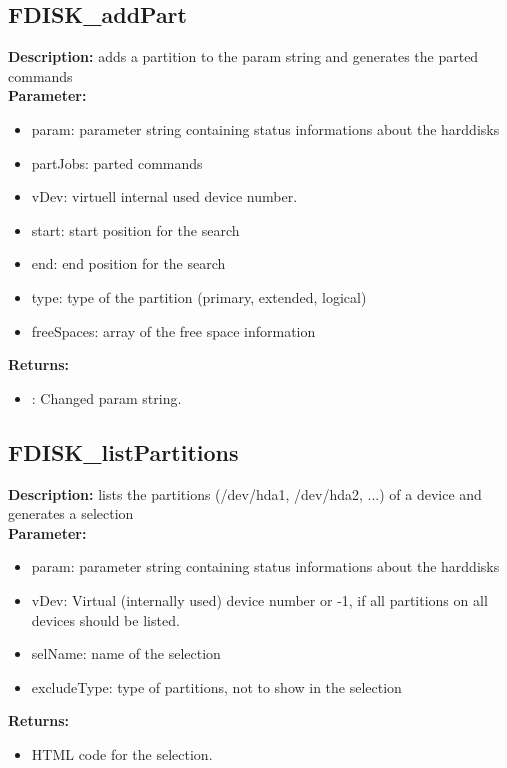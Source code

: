 \subsection{FDISK\_addPart}
\textbf{Description:} adds a partition to the param string and generates the parted commands\\
\textbf{Parameter:}
\begin{itemize}
\item param: parameter string containing status informations about the harddisks
\item partJobs: parted commands
\item vDev: virtuell internal used device number.
\item start: start position for the search
\item end: end position for the search
\item type: type of the partition (primary, extended, logical)
\item freeSpaces: array of the free space information
\end{itemize}
\textbf{Returns:}
\begin{itemize}
\item : Changed param string.
\end{itemize}

\subsection{FDISK\_listPartitions}
\textbf{Description:} lists the partitions (/dev/hda1, /dev/hda2, ...) of a device and generates a selection\\
\textbf{Parameter:}
\begin{itemize}
\item param: parameter string containing status informations about the harddisks
\item vDev: Virtual (internally used) device number or -1, if all partitions on all devices should be listed.
\item selName: name of the selection
\item excludeType: type of partitions, not to show in the selection
\end{itemize}
\textbf{Returns:}
\begin{itemize}
\item HTML code for the selection.
\end{itemize}

